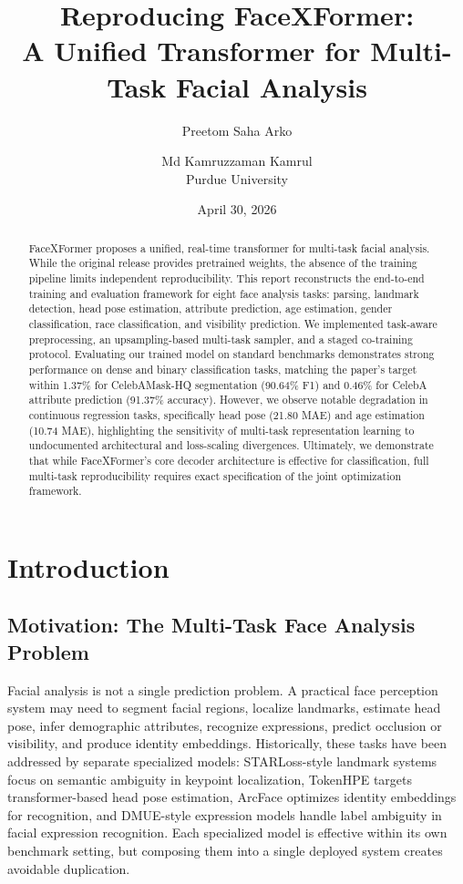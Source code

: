 \documentclass[11pt]{article}
\title{\textbf{Reproducing FaceXFormer:}\\A Unified Transformer for Multi-Task Facial Analysis}
\author{Preetom Saha Arko \and Md Kamruzzaman Kamrul\\Purdue University}
\date{April 30, 2026}
\begin{document}
\maketitle

\begin{abstract}
FaceXFormer proposes a unified, real-time transformer for multi-task facial analysis. While the original release provides pretrained weights, the absence of the training pipeline limits independent reproducibility. This report reconstructs the end-to-end training and evaluation framework for eight face analysis tasks: parsing, landmark detection, head pose estimation, attribute prediction, age estimation, gender classification, race classification, and visibility prediction. We implemented task-aware preprocessing, an upsampling-based multi-task sampler, and a staged co-training protocol. Evaluating our trained model on standard benchmarks demonstrates strong performance on dense and binary classification tasks, matching the paper's target within 1.37\% for CelebAMask-HQ segmentation (90.64\% F1) and 0.46\% for CelebA attribute prediction (91.37\% accuracy). However, we observe notable degradation in continuous regression tasks, specifically head pose (21.80 MAE) and age estimation (10.74 MAE), highlighting the sensitivity of multi-task representation learning to undocumented architectural and loss-scaling divergences. Ultimately, we demonstrate that while FaceXFormer's core decoder architecture is effective for classification, full multi-task reproducibility requires exact specification of the joint optimization framework.
\end{abstract}

\newpage
\tableofcontents
\newpage

\section{Introduction}


\subsection{Motivation: The Multi-Task Face Analysis Problem}


Facial analysis is not a single prediction problem. A practical face perception system may need to segment facial regions, localize landmarks, estimate head pose, infer demographic attributes, recognize expressions, predict occlusion or visibility, and produce identity embeddings. Historically, these tasks have been addressed by separate specialized models: STARLoss-style landmark systems focus on semantic ambiguity in keypoint localization, TokenHPE targets transformer-based head pose estimation, ArcFace optimizes identity embeddings for recognition, and DMUE-style expression models handle label ambiguity in facial expression recognition. Each specialized model is effective within its own benchmark setting, but composing them into a single deployed system creates avoidable duplication.
\end{document}
